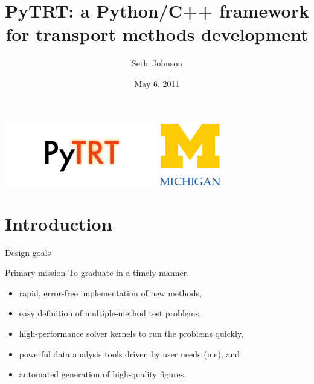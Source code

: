 \documentclass{beamer}
\title[PyTRT]%
{PyTRT: a Python/C++ framework for transport methods development}
\author[SRJ]{Seth~Johnson}
\institute[UMich]{
University of Michigan, Ann Arbor
}
\date[5/6/2011]{May 6, 2011}
\begin{document}

\begin{frame}
\titlepage
\vspace{-.25in}
\begin{center}
  \includegraphics[width=0.5\textwidth]{logo}
  \hspace{.5in}
  \includegraphics[width=0.2\textwidth]{../figures/umlogo}
\end{center}
\end{frame}

\section{Introduction}
\begin{frame}{Design goals}
\begin{block}{Primary mission}
   To graduate in a timely manner.
\end{block}


\begin{itemize}
  \item rapid, error-free implementation of new methods,
  \item easy definition of multiple-method test problems,
  \item high-performance solver kernels to run the problems quickly,
  \item powerful data analysis tools driven by user needs (me), and
  \item automated generation of high-quality figures.
\end{itemize}
  
\end{frame}
\end{document}
